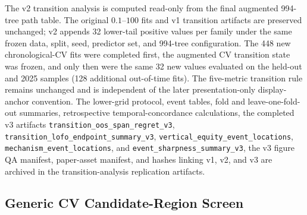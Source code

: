 \documentclass[10pt]{article}
\theoremstyle{definition}
\newcommand{\1}{\mathbf{1}}
\newcommand{\latesttext}[1]{\textcolor{latestPurple}{#1}}
\begin{document}
\latesttext{The v2 transition analysis is computed read-only from the final augmented 994-tree path table. The original $0.1$--$100$ fits and v1 transition artifacts are preserved unchanged; v2 appends 32 lower-tail positive values per family under the same frozen data, split, seed, predictor set, and 994-tree configuration. The 448 new chronological-CV fits were completed first, the augmented CV transition state was frozen, and only then were the same 32 new values evaluated on the held-out and 2025 samples (128 additional out-of-time fits). The five-metric transition rule remains unchanged and is independent of the later presentation-only display-anchor convention. The lower-grid protocol, event tables, fold and leave-one-fold-out summaries, retrospective temporal-concordance calculations, the completed v3 artifacts \texttt{transition\_oos\_span\_regret\_v3}, \texttt{transition\_lofo\_endpoint\_summary\_v3}, \texttt{vertical\_equity\_event\_locations}, \texttt{mechanism\_event\_locations}, and \texttt{event\_sharpness\_summary\_v3}, the v3 figure QA manifest, paper-asset manifest, and hashes linking v1, v2, and v3 are archived in the transition-analysis replication artifacts.}

\subsection{\texorpdfstring{\textcolor{latestPurple}{Generic CV Candidate-Region Screen}}{Generic CV Candidate-Region Screen}}
\label{subsec:candidate_screen_appendix}
\end{document}
